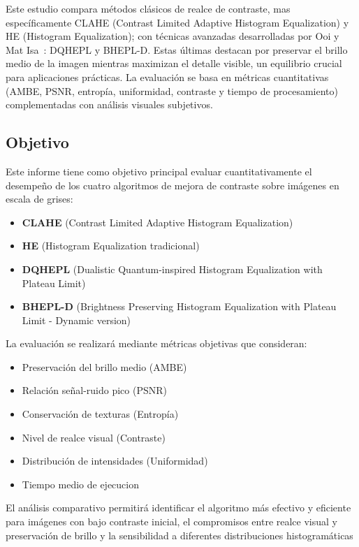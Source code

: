 \documentclass[sigchi]{acmart}
\begin{document}
Este estudio compara métodos clásicos de realce de contraste, mas específicamente CLAHE (Contrast
Limited Adaptive Histogram Equalization) y HE (Histogram Equalization); con técnicas avanzadas
desarrolladas por Ooi y Mat Isa~\cite{paper}: DQHEPL y BHEPL-D. Estas últimas destacan por
preservar el brillo medio de la imagen mientras maximizan el detalle visible, un equilibrio
crucial para aplicaciones prácticas. La evaluación se basa en métricas cuantitativas (AMBE,
PSNR, entropía, uniformidad, contraste y tiempo de procesamiento) complementadas con análisis
visuales subjetivos.

\subsection{Objetivo}
\label{subsec:objetivo}

Este informe tiene como objetivo principal evaluar cuantitativamente el desempeño de los cuatro
algoritmos de mejora de contraste sobre imágenes en escala de grises:

\begin{itemize}
	\item \textbf{CLAHE} (Contrast Limited Adaptive Histogram Equalization)
	\item \textbf{HE} (Histogram Equalization tradicional)
	\item \textbf{DQHEPL} (Dualistic Quantum-inspired Histogram Equalization with Plateau Limit)
	\item \textbf{BHEPL-D} (Brightness Preserving Histogram Equalization with Plateau Limit - Dynamic version)
\end{itemize}

La evaluación se realizará mediante métricas objetivas que consideran:

\begin{itemize}
	\item Preservación del brillo medio (AMBE)
	\item Relación señal-ruido pico (PSNR)
	\item Conservación de texturas (Entropía)
	\item Nivel de realce visual (Contraste)
	\item Distribución de intensidades (Uniformidad)
	\item Tiempo medio de ejecucion
\end{itemize}

El análisis comparativo permitirá identificar el algoritmo más efectivo y eficiente para
imágenes con bajo contraste inicial, el compromisos entre realce visual y preservación de
brillo y la sensibilidad a diferentes distribuciones histogramáticas
\end{document}
